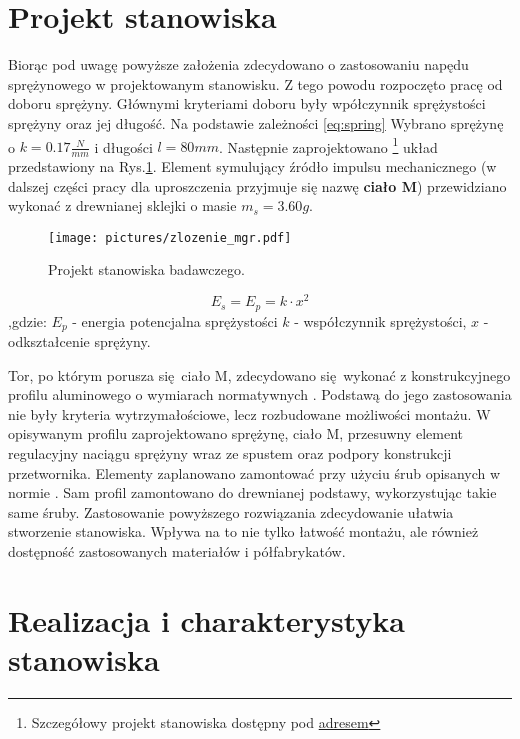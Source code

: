 
\section{Projekt stanowiska}
\label{sec:stand_project}

\indent
Biorąc pod uwagę powyższe założenia zdecydowano o zastosowaniu napędu sprężynowego 
w projektowanym stanowisku. Z tego powodu rozpoczęto pracę od doboru sprężyny. 
Głównymi kryteriami doboru były wpółczynnik sprężystości sprężyny oraz jej długość. 
Na podstawie zależności \ref{eq:spring} Wybrano sprężynę o $k=0.17\frac{N}{mm}$ 
i długości $l=80mm$. Następnie zaprojektowano
\footnote{Szczegółowy projekt stanowiska dostępny pod 
\href{http://www.google.com}{adresem}}%
układ przedstawiony na Rys.\ref{fig:test_stand}. Element symulujący źródło impulsu 
mechanicznego (w dalszej części pracy dla uproszczenia przyjmuje się nazwę \textbf{ciało M})
przewidziano wykonać z drewnianej sklejki o masie $m_s = 3.60g$.

\begin{figure}[htbp]
\centering
\texttt{[image: pictures/zlozenie\_mgr.pdf]}
\caption{Projekt stanowiska badawczego.}
\label{fig:test_stand}
\end{figure}

\begin{equation}
E_s = E_p = k \cdot x^2
\label{eq:spring}
\end{equation}
,gdzie: $E_p$ - energia potencjalna sprężystości $k$ - współczynnik 
sprężystości, $x$ - odkształcenie sprężyny.

\indent Tor, po którym porusza się ciało M, zdecydowano się wykonać z konstrukcyjnego 
profilu aluminowego o wymiarach normatywnych \cite{PN_constr}. Podstawą do jego zastosowania nie były
kryteria wytrzymałościowe, lecz rozbudowane możliwości montażu. W opisywanym profilu
zaprojektowano sprężynę, ciało M, przesuwny element regulacyjny naciągu sprężyny 
wraz ze spustem oraz podpory konstrukcji przetwornika. Elementy zaplanowano zamontować 
przy użyciu śrub opisanych w normie \cite{PN_constr}.
Sam profil zamontowano do drewnianej podstawy, wykorzystując takie same śruby. Zastosowanie
powyższego rozwiązania zdecydowanie ułatwia stworzenie stanowiska. Wpływa na to nie tylko
łatwość montażu, ale również dostępność zastosowanych materiałów i półfabrykatów.


\section{Realizacja i charakterystyka stanowiska}
\label{sec:stand_realization}

